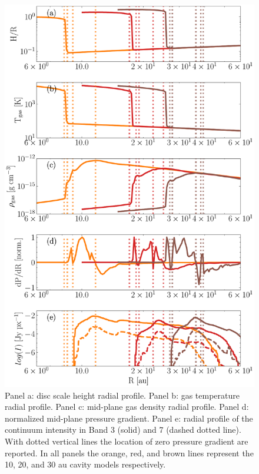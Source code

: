 \documentclass[fleqn,usenatbib]{mnras}
\begin{document}
        \begin{figure}
            \centering
            \includegraphics[width=\columnwidth]{Fig2}
            \caption{Panel a: disc scale height radial profile. Panel b: gas temperature radial profile. Panel c: mid-plane gas density radial profile. Panel d: normalized mid-plane pressure gradient. Panel e: radial profile of the continuum intensity in Band 3 (solid) and 7 (dashed dotted line). With dotted vertical lines the location of zero pressure gradient are reported. In all panels the orange, red, and brown lines represent the 10, 20, and 30 au cavity models respectively.
            \label{fig:scale-height}}
        \end{figure}
         
\end{document}

